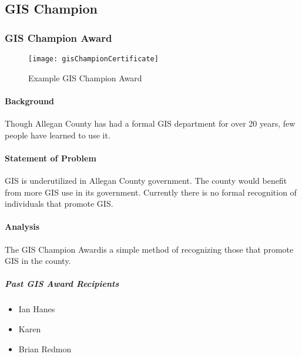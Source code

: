 %
%
%
%
%

\subsection{GIS Champion}
\subsubsection{GIS Champion Award}
 \begin{figure}[h!]
\centering
    \texttt{[image: gisChampionCertificate]}
\vspace{-.2in}

\caption{Example GIS Champion Award}
\end{figure}

\begin{adjmulticols}{2}{\innerMar}{\outerMar}
\paragraph{Background}
\noindent Though Allegan County has had a formal GIS department for over 20 years, few people have learned to use it.
\paragraph{Statement of Problem}
\noindent GIS is underutilized in Allegan County government.  The county would benefit from more GIS use in its government.  Currently there is no formal recognition of individuals that promote GIS.
\paragraph{Analysis}
\noindent The GIS Champion Awardis a simple method of recognizing those that promote GIS in the county.
\subparagraph*{Past GIS Award Recipients}
\begin{itemize}
\item Ian Hanes
\item Karen
\item Brian Redmon
\end{itemize}
\end{adjmulticols}
\clearpage
